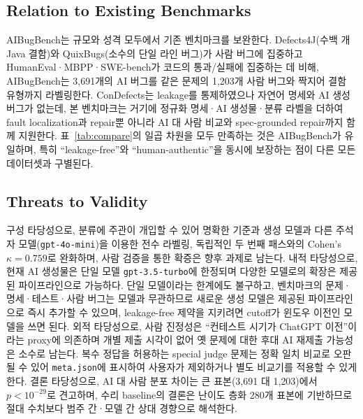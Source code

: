 \documentclass[10pt,conference]{IEEEtran}
\begin{document}
\subsection{Relation to Existing Benchmarks}
AIBugBench는 규모와 성격 모두에서 기존 벤치마크를 보완한다. Defects4J(수백 개 Java 결함)와 QuixBugs(소수의 단일 라인 버그)가 사람 버그에 집중하고 HumanEval·MBPP·SWE-bench가 코드의 통과/실패에 집중하는 데 비해, AIBugBench는 3{,}691개의 AI 버그를 같은 문제의 1{,}203개 사람 버그와 짝지어 결함 유형까지 라벨링한다. ConDefects는 leakage를 통제하였으나 자연어 명세와 AI 생성 버그가 없는데, 본 벤치마크는 거기에 정규화 명세·AI 생성물·분류 라벨을 더하여 fault localization과 repair뿐 아니라 AI 대 사람 비교와 spec-grounded repair까지 함께 지원한다. 표~\ref{tab:compare}의 일곱 차원을 모두 만족하는 것은 AIBugBench가 유일하며, 특히 ``leakage-free''와 ``human-authentic''을 동시에 보장하는 점이 다른 모든 데이터셋과 구별된다.

\subsection{Threats to Validity}
구성 타당성으로, 분류에 주관이 개입할 수 있어 명확한 기준과 생성 모델과 다른 주석자 모델(\texttt{gpt-4o-mini})을 이용한 전수 라벨링, 독립적인 두 번째 패스와의 Cohen's $\kappa=0.759$로 완화하며, 사람 검증을 통한 확증은 향후 과제로 남는다. 내적 타당성으로, 현재 AI 생성물은 단일 모델 \texttt{gpt-3.5-turbo}에 한정되며 다양한 모델로의 확장은 제공된 파이프라인으로 가능하다. 단일 모델이라는 한계에도 불구하고, 벤치마크의 문제·명세·테스트·사람 버그는 모델과 무관하므로 새로운 생성 모델은 제공된 파이프라인으로 즉시 추가할 수 있으며, leakage-free 제약을 지키려면 cutoff가 윈도우 이전인 모델을 쓰면 된다. 외적 타당성으로, 사람 진정성은 ``컨테스트 시기가 ChatGPT 이전''이라는 proxy에 의존하며 개별 제출 시각이 없어 옛 문제에 대한 후대 AI 재제출 가능성은 소수로 남는다. 복수 정답을 허용하는 special judge 문제는 정확 일치 비교로 오판될 수 있어 \texttt{meta.json}에 표시하여 사용자가 제외하거나 별도 비교기를 적용할 수 있게 한다. 결론 타당성으로, AI 대 사람 분포 차이는 큰 표본(3{,}691 대 1{,}203)에서 $p<10^{-29}$로 견고하며, 수리 baseline의 결론은 난이도 층화 280개 표본에 기반하므로 절대 수치보다 범주 간·모델 간 상대 경향으로 해석한다.
\end{document}
